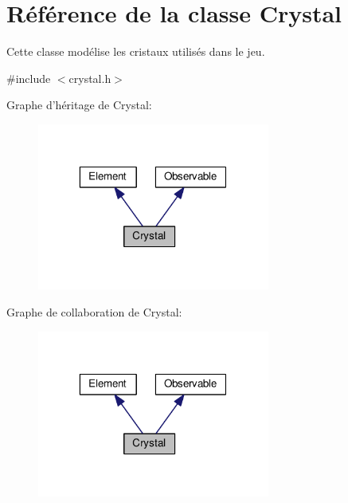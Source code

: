 \hypertarget{classCrystal}{\section{Référence de la classe Crystal}
\label{classCrystal}
}


Cette classe modélise les cristaux utilisés dans le jeu.  




{\ttfamily \#include $<$crystal.\+h$>$}



Graphe d'héritage de Crystal\+:\nopagebreak
\begin{figure}[H]
\begin{center}
\leavevmode
\includegraphics[width=217pt]{de/da2/classCrystal__inherit__graph}
\end{center}
\end{figure}


Graphe de collaboration de Crystal\+:\nopagebreak
\begin{figure}[H]
\begin{center}
\leavevmode
\includegraphics[width=217pt]{d4/db0/classCrystal__coll__graph}
\end{center}
\end{figure}
